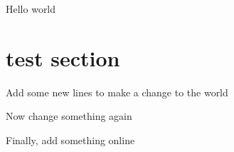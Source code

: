 \documentclass{article}
\begin{document}
	Hello world
	
	\section{test section}
	
	Add some new lines to make a change to the world

Now change something again

Finally, add something online
\end{document}
